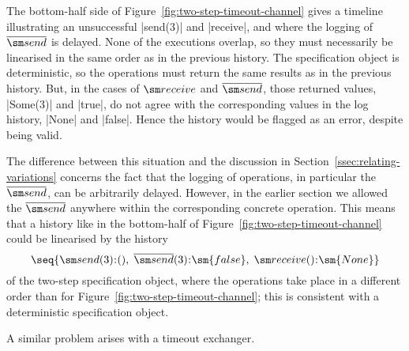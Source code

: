
The bottom-half side of Figure~\ref{fig:two-step-timeout-channel} gives a
timeline illustrating an unsuccessful |send(3)| and |receive|, and where the
logging of $\overline{\send}$ is delayed.  None of the executions overlap, so
they must necessarily be linearised in the same order as in the previous
history.  The specification object is deterministic, so the operations must
return the same results as in the previous history.  But, in the cases of
$\receive$ and $\overline{\send}$, those returned values, |Some(3)| and
|true|, do not agree with the corresponding values in the log history, |None|
and |false|.  Hence the history would be flagged as an error, despite being
valid.

The difference between this situation and the discussion in
Section~\ref{ssec:relating-variations} concerns the fact that the logging of
operations, in particular the $\overline{\send}$, can be arbitrarily delayed.
However, in the earlier section we allowed the $\overline{\send}$ anywhere
within the corresponding concrete operation.  This means that a history like
in the bottom-half of Figure~\ref{fig:two-step-timeout-channel} could be
linearised by the history
\[
\seq{ \send(3)\::(),\; \overline{\send}(3)\::\sm{false},\;
  \receive()\::\sm{None} }
\]
of the two-step specification object, where the operations take place in a
different order than for Figure~\ref{fig:two-step-timeout-channel}; this is
consistent with a deterministic specification object.

A similar problem arises with a timeout exchanger.


